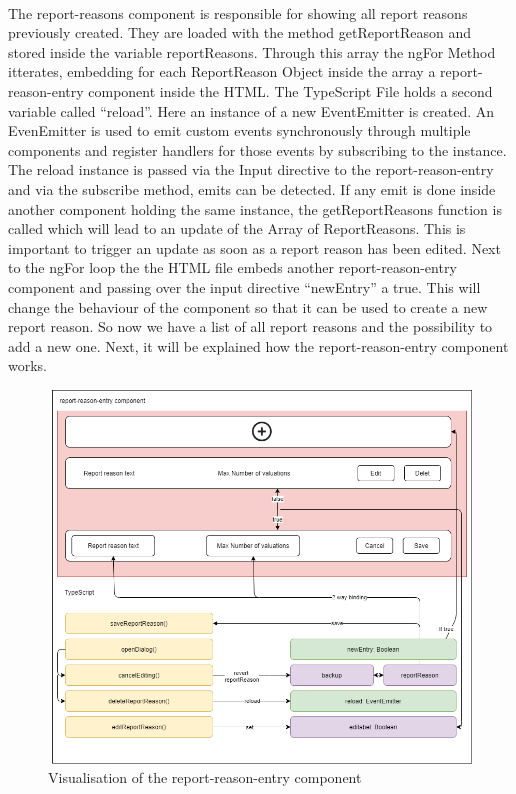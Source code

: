 \vspace{5mm}
\\
The report-reasons component is responsible for showing all report reasons previously created. They are loaded with the method getReportReason and stored inside the variable reportReasons. Through this array the ngFor Method itterates, embedding for each ReportReason Object inside the array a report-reason-entry component inside the HTML. The TypeScript File holds a second variable called “reload”. Here an instance of a new EventEmitter is created. An EvenEmitter is used to emit custom events synchronously through multiple components and register handlers for those events by subscribing to the instance. The reload instance is passed via the Input directive to the report-reason-entry and via the subscribe method, emits can be detected. If any emit is done inside another component holding the same instance, the getReportReasons function is called which will lead to an update of the Array of ReportReasons. This is important to trigger an update as soon as a report reason has been edited. Next to the ngFor loop the the HTML file embeds another report-reason-entry component and passing over the input directive “newEntry” a true. This will change the behaviour of the component so that it can be used to create a new report reason.
So now we have a list of all report reasons and the possibility to add a new one. Next, it will be explained how
the report-reason-entry component works.
\begin{figure}[h]
    \centering
    \includegraphics[width=1.0\textwidth]{./images/report_reason_entry_3}
    \caption{Visualisation of the report-reason-entry component}
    \label{fig:reportreasonent}
\end{figure}
